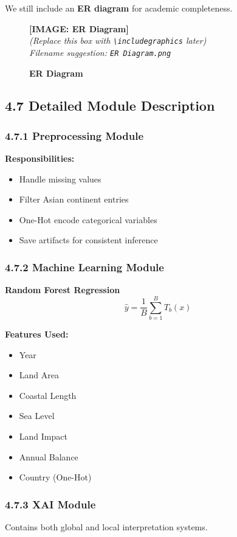 \documentclass[12pt, a4paper]{article}
\newcommand{\imageplaceholder}[2]{
  \begin{figure}[H]
    \centering
    \begin{tcolorbox}[colback=white, colframe=black, width=0.8\textwidth, arc=0mm, boxrule=1pt]
      \centering
      \vspace{#2}
      \textbf{\Large [IMAGE: #1]}\\
      \vspace{0.5cm}
      \textit{(Replace this box with \texttt{\textbackslash includegraphics} later)}\\
      \textit{Filename suggestion: \texttt{#1.png}}
      \vspace{#2}
    \end{tcolorbox}
    \caption{\textbf{#1}}
    \label{fig:#1}
  \end{figure}
}
\begin{document}
We still include an \textbf{ER diagram} for academic completeness.

\imageplaceholder{ER Diagram}{6cm}

\subsection{\textbf{4.7 Detailed Module Description}}

\subsubsection{\textbf{4.7.1 Preprocessing Module}}

\textbf{Responsibilities:}
\begin{itemize}
    \item Handle missing values
    \item Filter Asian continent entries
    \item One-Hot encode categorical variables
    \item Save artifacts for consistent inference
\end{itemize}

\subsubsection{\textbf{4.7.2 Machine Learning Module}}

\textbf{Random Forest Regression}
\[
\hat{y} = \frac{1}{B} \sum_{b=1}^{B} T_b(x)
\]

\textbf{Features Used:}
\begin{itemize}
    \item Year
    \item Land Area
    \item Coastal Length
    \item Sea Level
    \item Land Impact
    \item Annual Balance
    \item Country (One-Hot)
\end{itemize}

\subsubsection{\textbf{4.7.3 XAI Module}}

Contains both global and local interpretation systems.
\end{document}
